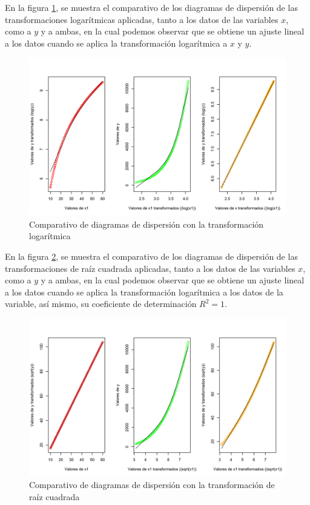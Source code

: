 \documentclass{article}
\begin{document}
En la figura \ref{tlog}, se muestra el comparativo de los diagramas de dispersión de las transformaciones logarítmicas aplicadas, tanto a los datos de las variables $x$, como a $y$ y a ambas, en la cual podemos observar que se obtiene un ajuste lineal a los datos cuando se aplica la transformación logarítmica a $x$ y $y$.

\begin{figure}
\centering
\includegraphics[scale=0.6]{Figures/graficaslog.png}
\caption{Comparativo de diagramas de dispersión con la transformación logarítmica}
\label{tlog}
\end{figure}

En la figura \ref{traiz}, se muestra el comparativo de los diagramas de dispersión de las transformaciones de raíz cuadrada aplicadas, tanto a los datos de las variables $x$, como a $y$ y a ambas, en la cual podemos observar que se obtiene un ajuste lineal a los datos cuando se aplica la transformación logarítmica a los datos de la variable, así mismo, su coeficiente de determinación $R^2 = 1$.

\begin{figure}
\centering
\includegraphics[scale=0.5]{Figures/graficasraiz.png}
\caption{Comparativo de diagramas de dispersión con la transformación de raíz cuadrada}
\label{traiz}
\end{figure}
\end{document}
